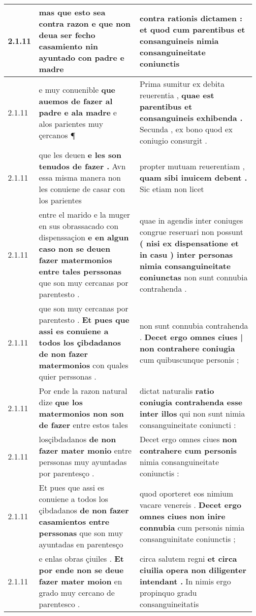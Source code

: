 \begin{tabular}{|p{1cm}|p{6.5cm}|p{6.5cm}|}
2.1.11 & mas que esto sea contra razon \textbf{ e que non deua ser fecho casamiento } nin ayuntado con padre e madre & contra rationis dictamen : \textbf{ et quod cum parentibus et consanguineis } nimia consanguineitate coniunctis \\\hline
2.1.11 & e muy conuenible \textbf{ que auemos de fazer al padre e ala madre } e alos parientes muy çercanos ¶ & Prima sumitur ex debita reuerentia , \textbf{ quae est parentibus et consanguineis exhibenda . } Secunda , ex bono quod ex coniugio consurgit . \\\hline
2.1.11 & que les deuen \textbf{ e les son tenudos de fazer . } Avn essa misma manera non les conuiene de casar con los parientes & propter mutuam reuerentiam , \textbf{ quam sibi inuicem debent . } Sic etiam non licet \\\hline
2.1.11 & entre el marido e la muger en sus obrassacado con dispenssaçion \textbf{ e en algun caso non se deuen fazer matermonios entre tales perssonas } que son muy cercanas por parentesto . & quae in agendis inter coniuges congrue reseruari non possunt \textbf{ ( nisi ex dispensatione et in casu ) inter personas nimia consanguineitate coniunctas } non sunt connubia contrahenda . \\\hline
2.1.11 & que son muy cercanas por parentesto . \textbf{ Et pues que assi es conuiene a todos los çibdadanos de non fazer matermonios } con quales quier perssonas . & non sunt connubia contrahenda . \textbf{ Decet ergo omnes ciues | non contrahere coniugia } cum quibuscunque personis ; \\\hline
2.1.11 & Por ende la razon natural dize \textbf{ que los matermonios non son de fazer } entre estos tales & dictat naturalis \textbf{ ratio coniugia contrahenda esse inter illos } qui non sunt nimia consanguineitate coniuncti : \\\hline
2.1.11 & losçibdadanos \textbf{ de non fazer mater monio } entre perssonas muy ayuntadas por parentesço . & Decet ergo omnes ciues \textbf{ non contrahere cum personis } nimia consanguineitate coniunctis : \\\hline
2.1.11 & Et pues que assi es conuiene a todos los çibdadanos \textbf{ de non fazer casamientos entre perssonas } que son muy ayuntadas en parentesço & quod oporteret eos nimium vacare venereis . \textbf{ Decet ergo omnes ciues non inire connubia } cum personis nimia consanguinitate coniunctis ; \\\hline
2.1.11 & e enlas obras çiuiles . \textbf{ Et por ende non se deue fazer mater moion } en grado muy cercano de parentesco . & circa salutem regni \textbf{ et circa ciuilia opera non diligenter intendant . } In nimis ergo propinquo gradu consanguineitatis \\\hline

\end{tabular}
